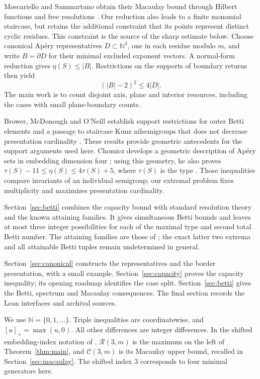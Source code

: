 \documentclass[11pt]{article}
\theoremstyle{definition}
\theoremstyle{remark}
\theoremstyle{plain}
\begin{document}
Moscariello and Sammartano obtain their Macaulay bound through Hilbert
functions and free resolutions \cite[Sections~2.2--2.3]{MS25}.
Our reduction also leads to a finite monomial staircase, but retains
the additional constraint that its points represent distinct cyclic
residues. This constraint is the source of the sharp estimate below.
Choose canonical Ap\'ery representatives $D\subset\mathbb N^3$, one
in each residue modulo $m$, and write $B=\partial D$ for their minimal
excluded exponent vectors. A normal-form reduction gives
$\eta(S)\le|B|$. Restrictions on the supports of boundary returns then
yield
\[
 (|B|-2)^2\le4|D|.
\]
The main work is to count disjoint axis, plane and interior resources,
including the cases with small plane-boundary counts.

Brower, McDonough and O'Neill establish support restrictions for outer
Betti elements \cite[Proposition~5.2]{BMO25} and a passage to staircase
Kunz nilsemigroups that does not decrease presentation cardinality
\cite[Theorem~6.2]{BMO25}. These results provide geometric antecedents
for the support arguments used here. Chomicz develops a geometric
description of Ap\'ery sets in embedding dimension four
\cite[Section~2.2]{Chomicz26A}; using this geometry, he also proves
$\tau(S)-11\le\eta(S)\le4\tau(S)+5$, where $\tau(S)$ is the type
\cite[Theorem~1.4]{Chomicz26B}. Those inequalities compare invariants
of an individual semigroup; our extremal problem fixes multiplicity
and maximizes presentation cardinality.

Section~\ref{sec:betti} combines the capacity bound with standard
resolution theory and the known attaining families. It gives simultaneous
Betti bounds and leaves at most three integer possibilities for each of
the maximal type and second total Betti number. The attaining families
are those of \cite{EHOOPK24}; the exact latter two extrema and all
attainable Betti tuples remain undetermined in general.

Section~\ref{sec:canonical} constructs the representatives and the
border presentation, with a small example. Section~\ref{sec:capacity}
proves the capacity inequality; its opening roadmap identifies the
case split. Section~\ref{sec:betti} gives the Betti, spectrum and
Macaulay consequences. The final section records the Lean interfaces
and archival sources.

We use $\mathbb N=\{0,1,\ldots\}$. Triple inequalities are coordinatewise,
and $[u]_+=\max(u,0)$. All other differences are integer differences.
In the shifted embedding-index notation of \cite{MS25},
$\mathcal R(3,m)$ is the maximum on the left of Theorem~\ref{thm:main},
and $\mathcal C(3,m)$ is its Macaulay upper bound, recalled in
Section~\ref{sec:macaulay}. The shifted index $3$ corresponds to
four minimal generators here.
\end{document}
